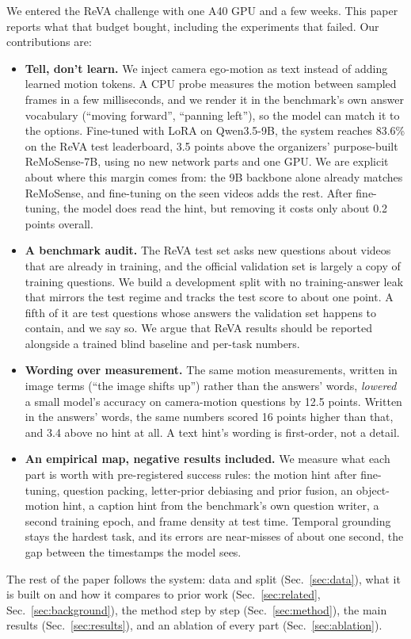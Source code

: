 We entered the ReVA challenge with one A40 GPU and a few weeks.
This paper reports what that budget bought, including the experiments
that failed. Our contributions are:

\begin{itemize}
\item \textbf{Tell, don't learn.} We inject camera ego-motion as text
instead of adding learned motion tokens. A CPU probe measures the motion
between sampled frames in a few milliseconds, and we render it in the
benchmark's own answer vocabulary (``moving forward'', ``panning left''),
so the model can match it to the options. Fine-tuned with LoRA on
Qwen3.5-9B, the system reaches 83.6\% on the ReVA test leaderboard, 3.5
points above the organizers' purpose-built ReMoSense-7B, using no new
network parts and one GPU. We are explicit about where this margin comes
from: the 9B backbone alone already matches ReMoSense, and fine-tuning on
the seen videos adds the rest. After fine-tuning, the model does read
the hint, but removing it costs only about 0.2 points overall.
\item \textbf{A benchmark audit.} The ReVA test set asks new questions
about videos that are already in training, and the official validation set
is largely a copy of training questions. We build a development split with
no training-answer leak that mirrors the test regime and tracks the test
score to about one point. A fifth of it are test questions whose answers
the validation set happens to contain, and we say so. We argue that ReVA
results should be reported alongside a trained blind baseline and per-task
numbers.
\item \textbf{Wording over measurement.} The same motion measurements,
written in image terms (``the image shifts up'') rather than the answers'
words, \emph{lowered} a small model's accuracy on camera-motion questions
by 12.5 points. Written in the answers' words, the same numbers scored 16
points higher than that, and 3.4 above no hint at all. A text hint's
wording is first-order, not a detail.
\item \textbf{An empirical map, negative results included.} We measure
what each part is worth with pre-registered success rules: the motion hint
after fine-tuning, question packing, letter-prior debiasing and prior
fusion, an object-motion hint, a caption hint from the benchmark's own
question writer, a second training epoch, and frame density at test
time. Temporal grounding stays the hardest task, and its errors are
near-misses of about one second, the gap between the timestamps the model
sees.
\end{itemize}

The rest of the paper follows the system: data and split
(Sec.~\ref{sec:data}), what it is built on and how it compares to prior
work (Sec.~\ref{sec:related}, Sec.~\ref{sec:background}), the method
step by step (Sec.~\ref{sec:method}), the main results
(Sec.~\ref{sec:results}), and an ablation of every part
(Sec.~\ref{sec:ablation}).
